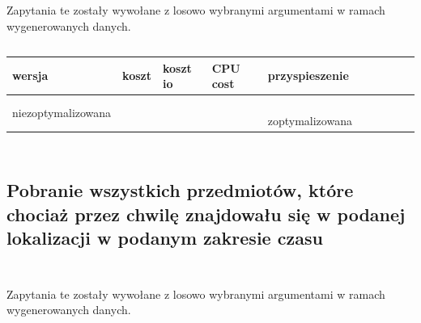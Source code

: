 \documentclass[11pt]{article}
\numberwithin{figure}{subsection}
\begin{document}
		\begin{lstlisting}[caption={Wersja niezoptymalizowana},captionpos=b]
		\end{lstlisting}
			
		\begin{lstlisting}[caption={Wersja zoptymalizowana},captionpos=b]
		\end{lstlisting}
		
		Zapytania te zostały wywołane z losowo wybranymi argumentami w ramach
		wygenerowanych danych. \\
		
		\begin{lstlisting}[caption={Wywołanie zapytań}, captionpos=b]
		\end{lstlisting}
		
		\begin{tabularx}{\textwidth}{|X|X|X|X|X|}
			\hline
			wersja & koszt & koszt io & CPU cost & przyspieszenie \\
			\hline
			niezoptymalizowana &  &  &  &  \
			\hline
			zoptymalizowana &  &  &  &  \
			\hline
		\end{tabularx}
		
		\begin{tabularx}{\textwidth}{|X|X|X|X|X|X|}
		\end{tabularx}
		
		\begin{tabularx}{\textwidth}{|X|X|X|X|X|X|}
		\end{tabularx}
		
		
		
		
		
		
		
		
		
		
		
	
	\subsection{Pobranie wszystkich przedmiotów, które chociaż przez chwilę
	znajdowału się w podanej lokalizacji w podanym zakresie czasu}
			
		\begin{lstlisting}[caption={Wersja niezoptymalizowana},captionpos=b]
		\end{lstlisting}
			
		\begin{lstlisting}[caption={Wersja zoptymalizowana},captionpos=b]
		\end{lstlisting}
		
		Zapytania te zostały wywołane z losowo wybranymi argumentami w ramach
		wygenerowanych danych. \\
		
\end{document}
